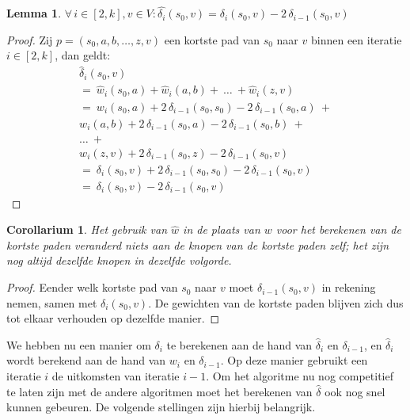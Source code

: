 \documentclass[conference]{IEEEtran}
\newtheorem{lemma}{Lemma}[section]
\newtheorem{corollary}{Corollarium}[section]
\theoremstyle{definition}
\theoremstyle{remark}
\let \oldforall \forall
\renewcommand{\forall}{\oldforall\,}
\begin{document}
\begin{lemma} \label{theorem:deltaI}
    $\forall i \in [2, k], v \in V: \hat{\delta_i}(s_0, v) = \delta_i(s_0, v) - 2\, \delta_{i-1}(s_0, v)$
\end{lemma}
\begin{proof} \label{proof:gabow:cancel}
    Zij $p = (s_0, a, b, \dots, z, v)$ een kortste pad van $s_0$ naar $v$ binnen een iteratie $i \in [2, k]$, dan geldt:
    \begin{gather*}
        \hat{\delta}_i(s_0, v)\\
        =\ \hat{w}_i(s_0, a) + \hat{w}_i(a, b) +\ \dots\ + \hat{w}_i(z, v)\\
        =\ w_i(s_0, a) + 2\, \delta_{i-1}(s_0, s_0) - 2\, \delta_{i-1}(s_0, a)\ +\\
        w_i(a, b) + 2\, \delta_{i-1}(s_0, a) - 2\, \delta_{i-1}(s_0, b)\ +\\
        \dots\ +\\
        w_i(z, v) + 2\, \delta_{i-1}(s_0, z) - 2\, \delta_{i-1}(s_0, v)\\
        =\ \delta_i(s_0, v) + 2\, \delta_{i-1}(s_0, s_0) - 2\, \delta_{i-1}(s_0, v)\\
        =\ \delta_i(s_0, v) - 2\, \delta_{i-1}(s_0, v)
    \end{gather*}
\end{proof}

\begin{corollary}
    Het gebruik van $\hat{w}$ in de plaats van $w$ voor het berekenen van de kortste paden veranderd niets aan de knopen van de kortste paden zelf; het zijn nog altijd dezelfde knopen in dezelfde volgorde.
\end{corollary}
\begin{proof}
    Eender welk kortste pad van $s_0$ naar $v$ moet $\delta_{i - 1}(s_0, v)$ in rekening nemen, samen met $\delta_i(s_0, v)$. De gewichten van de kortste paden blijven zich dus tot elkaar verhouden op dezelfde manier.
\end{proof}

We hebben nu een manier om $\delta_i$ te berekenen aan de hand van $\hat{\delta}_i$ en $\delta_{i-1}$, en $\hat{\delta}_i$ wordt berekend aan de hand van $w_i$ en $\delta_{i-1}$. Op deze manier gebruikt een iteratie $i$ de uitkomsten van iteratie $i-1$. Om het algoritme nu nog competitief te laten zijn met de andere algoritmen moet het berekenen van $\hat\delta$ ook nog snel kunnen gebeuren. De volgende stellingen zijn hierbij belangrijk.
\end{document}
